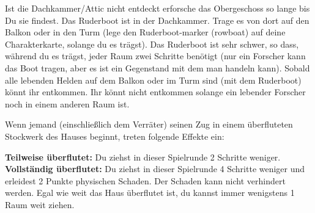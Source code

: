 





  \begin{itemize}
    \bitem Ist die Dachkammer/Attic nicht entdeckt erforsche das Obergeschoss so lange bis Du sie findest.
    \bitem Das Ruderboot ist in der Dachkammer. Trage es von dort auf den Balkon oder in den Turm (lege den Ruderboot-marker (rowboat) auf deine Charakterkarte, solange du es trägst). Das Ruderboot ist sehr schwer, so dass, während du es trägst, jeder Raum zwei Schritte benötigt (nur ein Forscher kann das Boot tragen, aber es ist ein Gegenstand mit dem man handeln kann).
    \bitem Sobald alle lebenden Helden auf dem Balkon oder im Turm sind (mit dem Ruderboot) könnt ihr entkommen. Ihr könnt nicht entkommen solange ein lebender Forscher noch in einem anderen Raum ist.
    \end{itemize}
\newpage

Wenn jemand (einschließlich dem Verräter) seinen Zug in einem überfluteten Stockwerk des Hauses beginnt, treten folgende Effekte ein:

  \begin{itemize}
    \bitem \textbf{Teilweise überflutet:} Du ziehst in dieser Spielrunde 2 Schritte weniger.
    \bitem \textbf{Vollständig überflutet:} Du ziehst in dieser Spielrunde 4 Schritte weniger und erleidest 2 Punkte physischen Schaden. Der Schaden kann nicht verhindert werden.
    \bitem Egal wie weit das Haus überflutet ist, du kannst immer wenigstens 1 Raum weit ziehen.

    \end{itemize}

